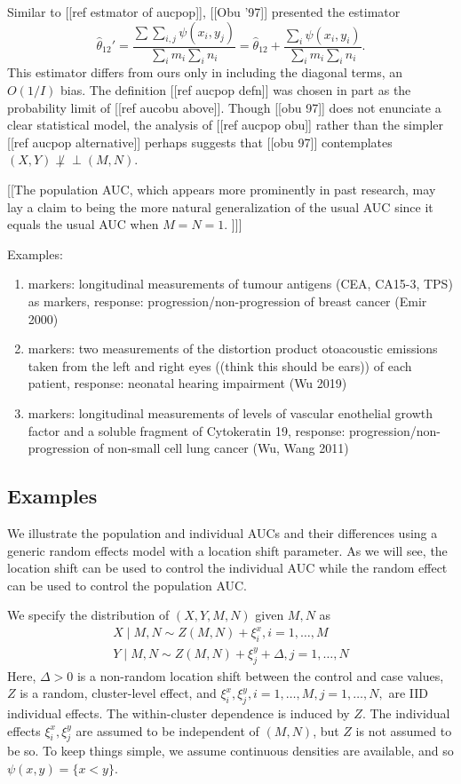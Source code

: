 \message{ !name(manuscript.tex)}\documentclass[12pt]{article}
\DeclareMathOperator{\AUC}{AUC}
\newcommand{\I}{I}
\newcommand{\cind}{\perp \!\!\! \perp}
\newcommand{\aucpophat}{\hat{\theta}_{12}}%
\newcommand{\kernel}{\psi}
\begin{document}
  Similar to [[ref estmator of aucpop]], [[Obu '97]] presented the estimator
  $$
  \aucpophat' = \frac{\sum\sum_{i,
      j}\psi(x_i,y_j)}{\sum_im_i\sum_in_i} = \aucpophat +\frac{\sum_i\psi(x_i,y_i)}{\sum_im_i\sum_in_i}.
  $$
  This estimator differs from ours only in including the diagonal
  terms, an $O(1/\I)$ bias. The definition [[ref aucpop defn]] was
  chosen in part as the probability limit of [[ref aucobu
  above]]. Though [[obu 97]] does not enunciate a clear statistical
  model, the analysis of [[ref aucpop obu]] rather than the simpler
  [[ref aucpop alternative]] perhaps suggests that [[obu 97]]
  contemplates $(X,Y)\not\cind (M,N)$.




[[The population AUC, which appears more prominently in past research,
may lay a claim to being the more natural generalization of the usual
AUC since it equals the usual AUC when $M=N=1$. ]]]


Examples:
\begin{enumerate}
\item markers: longitudinal measurements of tumour antigens
(CEA, CA15-3, TPS) as markers, response:
progression/non-progression of breast cancer (Emir 2000)
\item markers: two measurements of the distortion product
otoacoustic emissions taken from the left and right eyes
((think this should be ears)) of each patient, response:
neonatal hearing impairment (Wu 2019)
\item markers: longitudinal measurements of levels of vascular
enothelial growth factor and a soluble fragment of Cytokeratin
19, response: progression/non-progression of non-small cell
lung cancer (Wu, Wang 2011)
\end{enumerate}


\subsection{Examples} We illustrate the population and individual AUCs
and their differences using a generic random effects model with a
location shift parameter. As we will see, the location shift can be
used to control the individual AUC while the random effect can be used
to control the population AUC.

We specify the distribution of $(X,Y,M,N)$ given $M,N$ as
\begin{align}
  X \mid M,N \sim Z(M,N) + \xi_i^x, i=1,\ldots,M\\
  Y \mid M,N \sim Z(M,N) + \xi_j^y + \Delta, j=1,\ldots,N
\end{align}
Here, $\Delta>0$ is a non-random location shift between the control and
case values, $Z$ is a random, cluster-level effect, and
$\xi_i^x, \xi_j^y,i=1,\ldots,M,j=1,\ldots,N,$ are IID
individual effects. The within-cluster dependence is induced by
$Z$. The individual effects $\xi_i^x, \xi_j^y$ are assumed to be
independent of $(M,N)$, but $Z$ is not assumed to be so. To keep
things simple, we assume continuous densities are available, and so
$\kernel(x,y)=\{x<y\}$.%
\end{document}
